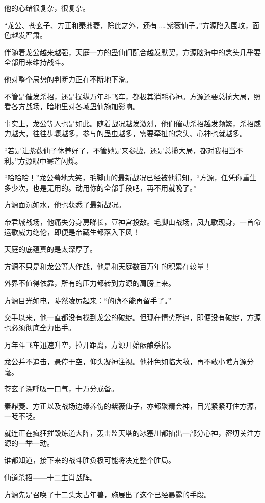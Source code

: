 \begin{this_body}
他的心绪很复杂，很复杂。

“龙公、苍玄子、方正和秦鼎菱，除此之外，还有……紫薇仙子。”方源陷入围攻，面色越发严肃。

伴随着龙公越来越强，天庭一方的蛊仙们配合越发默契，方源脑海中的念头几乎要全部用来维持战斗。

他对整个局势的判断力正在不断地下滑。

不管是催发杀招，还是操纵万年斗飞车，都极其消耗心神。方源还要总揽大局，照看各方战场，暗地里对各域蛊仙施加影响。

事实上，龙公等人也是如此。随着战况越发激烈，他们催动杀招越发频繁，杀招威力越大，往往步骤越多，参与的蛊虫越多，需要牵扯的念头、心神也就越多。

“若是让紫薇仙子休养好了，不管她是来参战，还是总揽大局，都对我相当不利。”方源眼中寒芒闪烁。

“哈哈哈！”龙公蓦地大笑，毛脚山的最新战况已经被他得知，“方源，任凭你重生多少次，也是无用的。动用你的全部手段吧，再不用就晚了。”

方源面沉如水，他也获悉了最新战况。

帝君城战场，他痛失分身房睇长，豆神宫投敌。毛脚山战场，凤九歌现身，一首命运歌威力绝伦，即便是帝藏生都落入下风！

天庭的底蕴真的是太深厚了。

方源不只是和龙公等人作战，他是和天庭数百万年的积累在较量！

外界不值得依靠，所有的压力都转到方源的肩膀上来。

方源目光如电，陡然凌厉起来：“的确不能再留手了。”

交手以来，他一直都没有找到龙公的破绽。但现在情势所逼，即便没有破绽，方源也必须彻底全力出手。

万年斗飞车迅速升空，拉开距离，方源开始酝酿杀招。

龙公并不追击，悬停于空，仰头凝神注视。他神色如临大敌，再不敢小瞧方源分毫。

苍玄子深呼吸一口气，十万分戒备。

秦鼎菱、方正以及战场边缘养伤的紫薇仙子，亦都聚精会神，目光紧紧盯住方源，一眨不眨。

就连正在疯狂摧毁炼道大阵，轰击监天塔的冰塞川都抽出一部分心神，密切关注方源的一举一动。

谁都知道，接下来的战斗胜负极可能将决定整个胜局。

仙道杀招——十二生肖战阵。

方源先是召唤了十二头太古年兽，施展出了这个已经暴露的手段。


\end{this_body}
